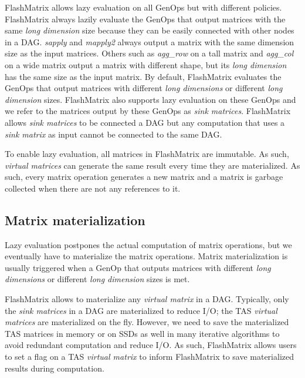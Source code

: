 FlashMatrix allows lazy evaluation on all GenOps but with different policies.
FlashMatrix always lazily evaluate the GenOps that output matrices with
the same \textit{long dimension} size because they can be easily connected
with other nodes in a DAG. \textit{sapply} and \textit{mapply2} always
output a matrix with the same dimension size as the input matrices. Others such
as \textit{agg\_row} on a tall matrix and \textit{agg\_col} on a wide matrix output
a matrix with different shape, but its \textit{long dimension} has the same size
as the input matrix. By default, FlashMatrix evaluates the GenOps that output
matrices with different \textit{long dimensions} or different \textit{long dimension}
sizes. FlashMatrix also supports lazy evaluation on these GenOps and we refer to
the matrices output by these GenOps as \textit{sink matrices}.
FlashMatrix allows \textit{sink matrices} to be connected a DAG but any computation
that uses a \textit{sink matrix} as input cannot be connected to the same DAG.

To enable lazy evaluation, all matrices in FlashMatrix are immutable.
As such, \textit{virtual matrices} can generate the same result every time
they are materialized. As such, every matrix operation generates a new matrix
and a matrix is garbage collected when there are not any references to it.

\subsection{Matrix materialization} \label{sec:materialize}
Lazy evaluation postpones the actual computation of matrix operations, but we
eventually have to materialize the matrix operations. Matrix materialization
is usually triggered when a GenOp that outputs matrices with different
\textit{long dimensions} or different \textit{long dimension} sizes is met.

FlashMatrix allows to materialize any \textit{virtual matrix} in a DAG.
Typically, only the \textit{sink matrices} in a DAG are materialized to reduce
I/O; the TAS \textit{virtual matrices} are materialized on the fly. However,
we need to save the materialized TAS matrices in memory or on SSDs as well in
many iterative algorithms to avoid redundant computation and reduce I/O. As such,
FlashMatrix allows users to set a flag on a TAS \textit{virtual matrix} to
inform FlashMatrix to save materialized results during computation.

